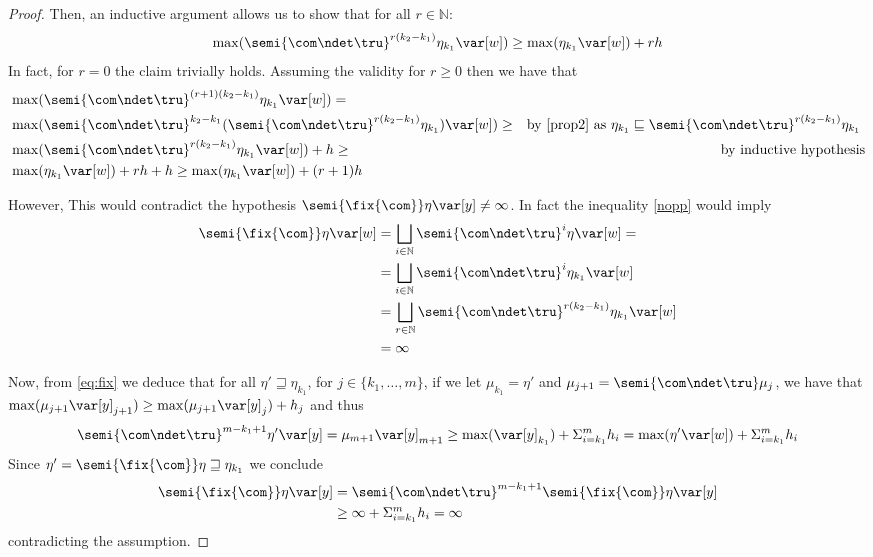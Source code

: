 \begin{proof}
  \noindent    
  Then, an inductive argument allows us to show that for all \(r \in \mathbb{N}\):
  \begin{equation}\label{nopp}
    \max(\semi{\com \ndet \tru}^{r(k_2-k_1)} \eta_{k_1} \var[w]) \geq \max(\eta_{k_1}
    \var[w]) + r h
  \end{equation}  
  In fact, for \(r=0\) the claim trivially holds. Assuming the
  validity for \(r\geq 0\) then we have that
  \begin{align*}    
    & \max(\semi{\com \ndet \tru}^{(r+1)(k_2-k_1)} \eta_{k_1} \var[w]) =\\
    &\max(\semi{\com \ndet \tru}^{k_2-k_1} ( \semi{\com \ndet \tru}^{r(k_2-k_1)} \eta_{k_1}) \var[w]) \geq & \mbox{by \eqref{prop2} as \(\eta_{k_1} \sqsubseteq \semi{\com \ndet \tru}^{r(k_2-k_1)} \eta_{k_1}\) }\\
    &\max(\semi{\com \ndet \tru}^{r(k_2-k_1)} \eta_{k_1} \var[w]) + h \geq & \mbox{by inductive hypothesis}\\
    &  \max(\eta_{k_1}\var[w])  + rh + h
      \geq 
      \max(\eta_{k_1}\var[w])  + (r+1)h
  \end{align*}

  \noindent
  However, This would contradict the hypothesis
  \(\semi{\fix{\com}} \eta \var[y] \neq \infty\). In fact the
  inequality \eqref{nopp} would imply
  \begin{align*}
    \semi{\fix{\com}} \eta \var[w]
    & = \bigsqcup_{i \in \mathbb{N}} \semi{\com
      \ndet \tru}^i \eta \var[w] =\\ 
    & =  \bigsqcup_{i \in \mathbb{N}} \semi{\com \ndet
      \tru}^i \eta_{k_1} \var[w]\\ 
    & = \bigsqcup_{r \in \mathbb{N}} \semi{\com \ndet
      \tru}^{r(k_2-k_1)} \eta_{k_1} \var[w]\\
    & = \infty
  \end{align*}

  Now, from \eqref{eq:fix} we deduce that for all
  \(\eta' \sqsupseteq \eta_{k_1}\), for \(j \in \{ k_1, \ldots, m\}\),
  if we let \(\mu_{k_1} = \eta'\) and
  \(\mu_{j+1} = \semi{\com \ndet \tru} \mu_j\), we have that
  \(\max(\mu_{j+1} \var[y]_{j+1}) \geq \max(\mu_{j+1} \var[y]_{j}) +
  h_j\) and thus
  \[
  \semi{\com \ndet \tru}^{m-k_1+1} \eta' \var[y] = \mu_{m+1}
  \var[y]_{m+1} \geq 
  \max(\var[y]_{k_1}) + \Sigma_{i=k_1}^m h_i = \max(\eta' \var[w]) + \Sigma_{i=k_1}^m h_i
  \]
  Since \(\eta' = \semi{\fix{\com}} \eta \sqsupseteq \eta_{k_1}\) we conclude
  \begin{align*}
    \semi{\fix{\com}} \eta \var[y]
    & = \semi{\com \ndet \tru}^{m-k_1+1} \semi{\fix{\com}} \eta \var[y]\\
    & \geq \infty + \Sigma_{i=k_1}^m h_i = \infty
  \end{align*}
  contradicting the assumption.
  

\end{proof}
